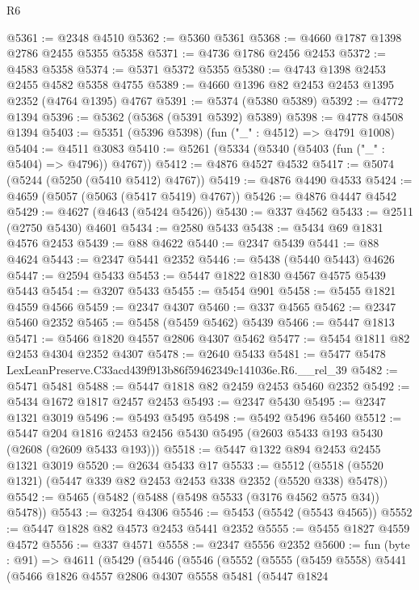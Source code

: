 \begin{lexlean}{R6}
\begin{coremodule}
@5361 := @2348 @4510
@5362 := @5360 @5361
@5368 := @4660 @1787 @1398 @2786 @2455 @5355 @5358
@5371 := @4736 @1786 @2456 @2453
@5372 := @4583 @5358
@5374 := @5371 @5372 @5355
@5380 := @4743 @1398 @2453 @2455 @4582 @5358 @4755
@5389 := @4660 @1396 @82 @2453 @2453 @1395 @2352 (@4764 @1395) @4767
@5391 := @5374 (@5380 @5389)
@5392 := @4772 @1394
@5396 := @5362 (@5368 (@5391 @5392) @5389)
@5398 := @4778 @4508 @1394
@5403 := @5351 (@5396 @5398) (fun ("_" : @4512) => @4791 @1008)
@5404 := @4511 @3083
@5410 := @5261 (@5334 (@5340 (@5403 (fun ("_" : @5404) => @4796)) @4767))
@5412 := @4876 @4527 @4532
@5417 := @5074 (@5244 (@5250 (@5410 @5412) @4767))
@5419 := @4876 @4490 @4533
@5424 := @4659 (@5057 (@5063 (@5417 @5419) @4767))
@5426 := @4876 @4447 @4542
@5429 := @4627 (@4643 (@5424 @5426))
@5430 := @337 @4562
@5433 := @2511 (@2750 @5430) @4601
@5434 := @2580 @5433
@5438 := @5434 @69 @1831 @4576 @2453
@5439 := @88 @4622
@5440 := @2347 @5439
@5441 := @88 @4624
@5443 := @2347 @5441 @2352
@5446 := @5438 (@5440 @5443) @4626
@5447 := @2594 @5433
@5453 := @5447 @1822 @1830 @4567 @4575 @5439 @5443
@5454 := @3207 @5433
@5455 := @5454 @901
@5458 := @5455 @1821 @4559 @4566
@5459 := @2347 @4307
@5460 := @337 @4565
@5462 := @2347 @5460 @2352
@5465 := @5458 (@5459 @5462) @5439
@5466 := @5447 @1813
@5471 := @5466 @1820 @4557 @2806 @4307 @5462
@5477 := @5454 @1811 @82 @2453 @4304 @2352 @4307
@5478 := @2640 @5433
@5481 := @5477 @5478 LexLeanPreserve.C33acd439f913b86f59462349c141036e.R6.__rel_39
@5482 := @5471 @5481
@5488 := @5447 @1818 @82 @2459 @2453 @5460 @2352
@5492 := @5434 @1672 @1817 @2457 @2453
@5493 := @2347 @5430
@5495 := @2347 @1321 @3019
@5496 := @5493 @5495
@5498 := @5492 @5496 @5460
@5512 := @5447
    @204
    @1816
    @2453
    @2456
    @5430
    @5495
    (@2603 @5433 @193 @5430 (@2608 (@2609 @5433 @193)))
@5518 := @5447 @1322 @894 @2453 @2455 @1321 @3019
@5520 := @2634 @5433 @17
@5533 := @5512 (@5518 (@5520 @1321) (@5447 @339 @82 @2453 @2453 @338 @2352 (@5520 @338) @5478))
@5542 := @5465 (@5482 (@5488 (@5498 @5533 (@3176 @4562 @575 @34)) @5478))
@5543 := @3254 @4306
@5546 := @5453 (@5542 (@5543 @4565))
@5552 := @5447 @1828 @82 @4573 @2453 @5441 @2352
@5555 := @5455 @1827 @4559 @4572
@5556 := @337 @4571
@5558 := @2347 @5556 @2352
@5600 := fun (byte : @91) =>
  @4611
    (@5429
      (@5446
        (@5546
          (@5552
            (@5555
              (@5459 @5558)
              @5441
              (@5466
                @1826
                @4557
                @2806
                @4307
                @5558
                @5481
                (@5447
                  @1824

\end{coremodule}
\end{lexlean}

